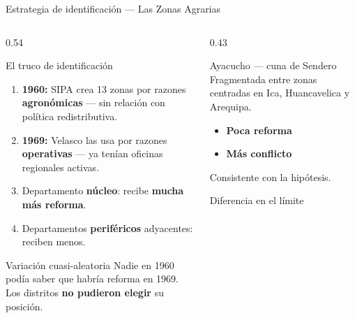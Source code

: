 \documentclass[aspectratio=169,t]{beamer}
\newcommand{\hl}[1]{\textcolor{azulmedio}{\textbf{#1}}}
\begin{document}
\begin{frame}{Estrategia de identificaci\'on --- Las Zonas Agrarias}
\begin{columns}[T]
  \begin{column}{0.54\textwidth}
    \begin{block}{El truco de identificaci\'on}
    \small\begin{enumerate}
      \item \textbf{1960:} SIPA crea 13 zonas por razones
            \hl{agron\'omicas} --- sin relaci\'on con
            pol\'itica redistributiva.
      \item \textbf{1969:} Velasco las usa por razones
            \hl{operativas} --- ya ten\'ian oficinas
            regionales activas.
      \item Departamento \textbf{n\'ucleo}: recibe
            \hl{mucha m\'as reforma}.
      \item Departamentos \textbf{perif\'ericos}
            adyacentes: reciben menos.
    \end{enumerate}
    \end{block}
    \vspace{0.1cm}
    \begin{exampleblock}{\small Variaci\'on cuasi-aleatoria}
    \small Nadie en 1960 pod\'ia saber que habr\'ia
    reforma en 1969. Los distritos
    \textbf{no pudieron elegir} su posici\'on.
    \end{exampleblock}
  \end{column}
  \begin{column}{0.43\textwidth}
    \begin{alertblock}{\small Ayacucho --- cuna de Sendero}
    \small Fragmentada entre zonas centradas en Ica,
    Huancavelica y Arequipa.
    \begin{itemize}
      \item[$\Rightarrow$]\hl{Poca reforma}
      \item[$\Rightarrow$]\hl{M\'as conflicto}
    \end{itemize}
    Consistente con la hip\'otesis.
    \end{alertblock}
    \vspace{0.15cm}
    \begin{block}{\small Diferencia en el l\'imite}
    \scriptsize
    \begin{tabular}{lc}

\end{tabular}
\end{block}
\end{column}
\end{columns}
\end{frame}
\end{document}
